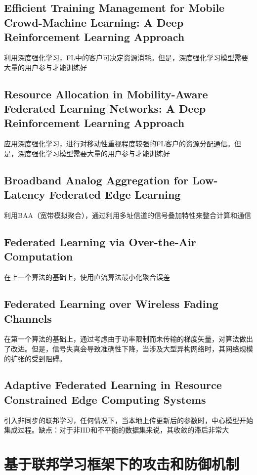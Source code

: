 \documentclass[12pt, a4paper]{article}
\begin{document}
        \subsection*{Efficient Training Management for Mobile Crowd-Machine Learning: A Deep Reinforcement Learning Approach\cite{8716527}}
            利用深度强化学习，FL中的客户可决定资源消耗。但是，深度强化学习模型需要大量的用户参与才能训练好        
        \subsection*{Resource Allocation in Mobility-Aware Federated Learning Networks: A Deep Reinforcement Learning Approach\cite{nguyen2019resource}}
            应用深度强化学习，进行对移动性重视程度较强的FL客户的资源分配通信。但是，深度强化学习模型需要大量的用户参与才能训练好
        \subsection*{Broadband Analog Aggregation for Low-Latency Federated Edge Learning\cite{8870236}}
            利用BAA（宽带模拟聚合），通过利用多址信道的信号叠加特性来整合计算和通信
        \subsection*{Federated Learning via Over-the-Air Computation\cite{8952884}}
            在上一个算法的基础上，使用直流算法最小化聚合误差
        \subsection*{Federated Learning over Wireless Fading Channels\cite{amiri2020federated}}
            在第一个算法的基础上，通过考虑由于功率限制而未传输的梯度矢量，对算法做出了改进。但是，信号失真会导致准确性下降，当涉及大型异构网络时，其网络规模的扩张的受到阻碍。
        \subsection*{Adaptive Federated Learning in Resource Constrained Edge Computing Systems\cite{wang2019adaptive}}
            引入非同步的联邦学习，任何情况下，当本地上传更新后的参数时，中心模型开始集成过程。缺点：对于非IID和不平衡的数据集来说，其收敛的滞后非常大
            
    \section*{基于联邦学习框架下的攻击和防御机制}
\end{document}
